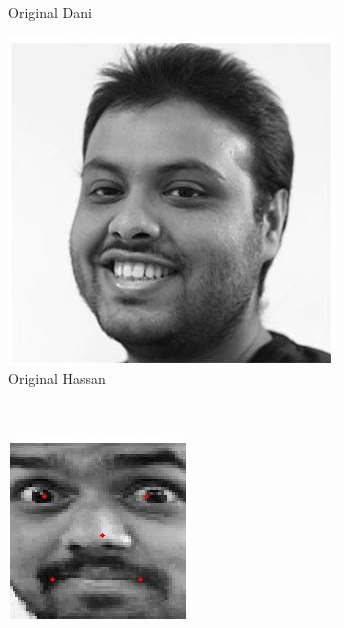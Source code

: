 \documentclass[12pt,a4paper,titlepage]{article}
\begin{document}
\begin{figure}[H]
\begin{subfigure}{0.3\textwidth}
		\caption{Original Dani}
	\end{subfigure}	
	\quad
	\begin{subfigure}{0.3\columnwidth}
		\centering
		\includegraphics[width=\textwidth]{mapping5.jpg}
		\caption{Original Hassan}
	\end{subfigure}
	\\
	\begin{subfigure}{0.3\textwidth}
		\centering
		\includegraphics[width=\textwidth]{mapping2.jpg}

\end{subfigure}
\end{figure}
\end{document}
